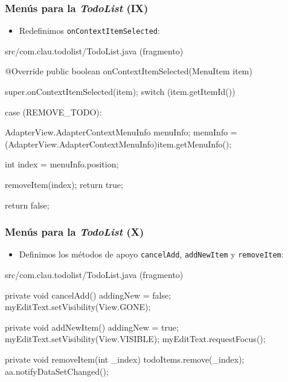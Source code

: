 \documentclass[hyperref={pdfpagelabels=true},ucs]{beamer}
\begin{document}
\begin{frame}[fragile]
\frametitle{Menús para la \emph{TodoList} (IX)}

\begin{itemize}
\item Redefinimos \verb|onContextItemSelected|:
\end{itemize}

\begin{tiny}
\begin{block}{src/com.clau.todolist/TodoList.java (fragmento)}
\begin{java}
@Override
public boolean onContextItemSelected(MenuItem item) {
  super.onContextItemSelected(item);
  switch (item.getItemId()) {
    case (REMOVE_TODO): {
      AdapterView.AdapterContextMenuInfo menuInfo;
      menuInfo =(AdapterView.AdapterContextMenuInfo)item.getMenuInfo();

      int index = menuInfo.position;

      removeItem(index);
      return true;
    }
  }
  return false;
}

\end{java}
\end{block}
\end{tiny}

\end{frame}

\begin{frame}[fragile]
\frametitle{Menús para la \emph{TodoList} (X)}

\begin{itemize}
\item Definimos los métodos de apoyo \verb|cancelAdd|,
  \verb|addNewItem| y \verb|removeItem|:
\end{itemize}

\begin{tiny}
\begin{block}{src/com.clau.todolist/TodoList.java (fragmento)}
\begin{java}
private void cancelAdd() {
  addingNew = false;
  myEditText.setVisibility(View.GONE);
}

private void addNewItem() {
  addingNew = true;
  myEditText.setVisibility(View.VISIBLE);
  myEditText.requestFocus();
}

private void removeItem(int _index) {
  todoItems.remove(_index);
  aa.notifyDataSetChanged();
}
\end{java}
\end{block}
\end{tiny}

\end{frame}
\end{document}
